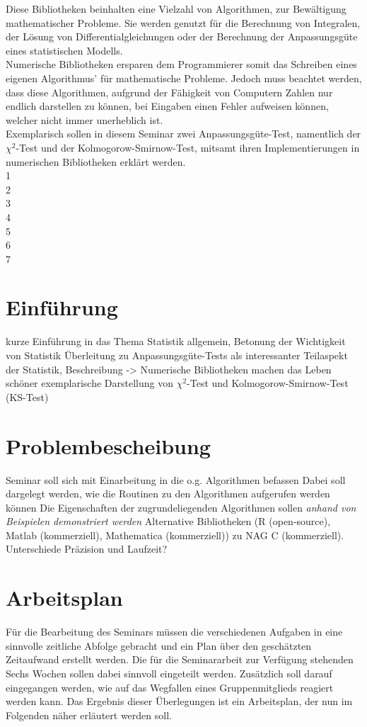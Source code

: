 \documentclass{article}
\begin{document}
Diese Bibliotheken beinhalten eine Vielzahl von Algorithmen, zur Bewältigung mathematischer Probleme. Sie werden genutzt für die Berechnung von Integralen, der Lösung von Differentialgleichungen oder der Berechnung der Anpassungsgüte eines statistischen Modells.\\
Numerische Bibliotheken ersparen dem Programmierer somit das Schreiben eines eigenen Algorithmus' für mathematische Probleme. Jedoch muss beachtet werden, dass diese Algorithmen, aufgrund der Fähigkeit von Computern Zahlen nur endlich darstellen zu können, bei Eingaben einen Fehler aufweisen können, welcher nicht immer unerheblich ist.\\
Exemplarisch sollen in diesem Seminar zwei Anpassungsgüte-Test, namentlich der $\chi^2$-Test und der Kolmogorow-Smirnow-Test, mitsamt ihren Implementierungen in numerischen Bibliotheken erklärt werden.
\\1\\
2\\
3\\
4\\
5\\
6\\
7

\newpage
\section{Einführung}
kurze Einführung in das Thema Statistik allgemein, Betonung der Wichtigkeit von Statistik
Überleitung zu Anpassungsgüte-Tests als interessanter Teilaspekt der Statistik, Beschreibung
-> Numerische Bibliotheken machen das Leben schöner
exemplarische Darstellung von $\chi^2$-Test und Kolmogorow-Smirnow-Test (KS-Test)

\section{Problembescheibung}
Seminar soll sich mit Einarbeitung in die o.g. Algorithmen befassen
Dabei soll dargelegt werden, wie die Routinen zu den Algorithmen aufgerufen werden können
Die Eigenschaften der zugrundeliegenden Algorithmen sollen \emph{anhand von Beispielen demonstriert werden}
Alternative Bibliotheken (R (open-source), Matlab (kommerziell), Mathematica (kommerziell)) zu NAG C (kommerziell).
Unterschiede Präzision und Laufzeit?

\section{Arbeitsplan}
Für die Bearbeitung des Seminars müssen die verschiedenen Aufgaben in eine sinnvolle zeitliche Abfolge gebracht und ein Plan über den geschätzten Zeitaufwand erstellt werden.
Die für die Seminararbeit zur Verfügung stehenden Sechs Wochen sollen dabei sinnvoll eingeteilt werden.
Zusätzlich soll darauf eingegangen werden, wie auf das Wegfallen eines Gruppenmitglieds reagiert werden kann.
Das Ergebnis dieser Überlegungen ist ein Arbeitsplan, der nun im Folgenden näher erläutert werden soll.
\end{document}
